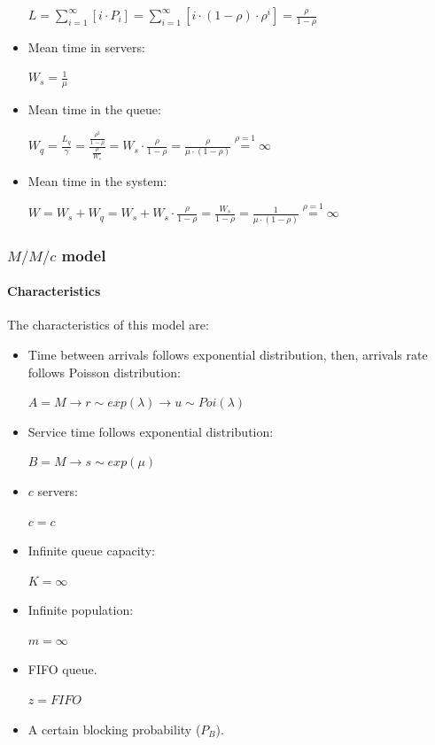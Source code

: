 \documentclass[
	12pt,
	twoside
]{book}
\begin{document}
\begin{itemize}
{		$
			L = \sum_{i=1}^{\infty} \left[ i \cdot P_i \right] =
			\sum_{i=1}^{\infty} \left[ i \cdot (1-\rho) \cdot \rho^i \right] =
			\frac {\rho} {1-\rho}
		$
	}
	\item {
		Mean time in servers:

		$
			W_s = \frac {1} {\mu}
		$
	}
	\item {
		Mean time in the queue:

		$
			W_q = \frac {L_q} {\gamma} = \frac {\frac{\rho^2}{1-\rho}} {\frac{\rho}{W_s}} =
			W_s \cdot \frac {\rho} {1-\rho} =
			\frac {\rho} {\mu \cdot (1-\rho)} \overset {\rho=1} {=} \infty
		$
	}
	\item {
		Mean time in the system:

		$
			W =
			W_s + W_q =
			W_s + W_s \cdot \frac {\rho} {1-\rho} =
			\frac {W_s} {1-\rho} =
			\frac {1} {\mu \cdot (1-\rho)} \overset {\rho=1} {=} \infty
		$
	}
\end{itemize}

\subsubsection{$M/M/c$ model}

\paragraph{Characteristics}

The characteristics of this model are:

\begin{itemize}
	\item {
		Time between arrivals follows exponential distribution, then, arrivals rate follows Poisson distribution:

		$
			A = M \rightarrow r \sim exp(\lambda) \rightarrow u \sim Poi(\lambda)
		$
	}
	\item {
		Service time follows exponential distribution:

		$
			B = M \rightarrow s \sim exp(\mu)
		$
	}
	\item {
		$c$ servers:

		$
			c = c
		$
	}
	\item {
		Infinite queue capacity:

		$
			K = \infty
		$
	}
	\item {
		Infinite population:

		$
			m = \infty
		$
	}
	\item {
		FIFO queue.

		$
			z = FIFO
		$
	}
	\item A certain blocking probability ($P_B$).
\end{itemize}
\end{document}
